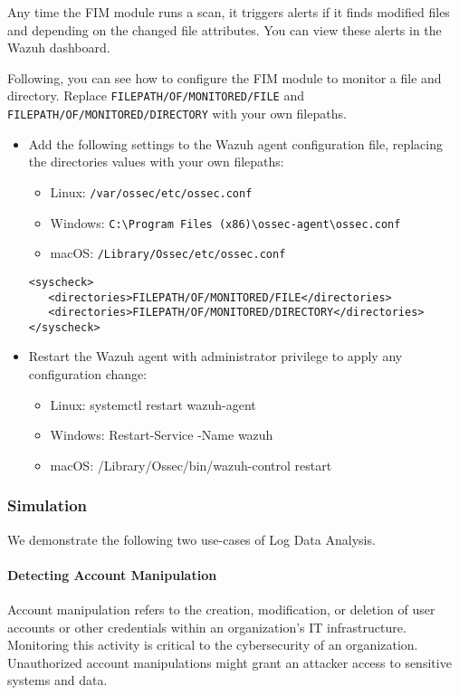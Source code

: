Any time the FIM module runs a scan, it triggers alerts if it finds modified files and depending on the changed file attributes. You can view these alerts in the Wazuh dashboard.

Following, you can see how to configure the FIM module to monitor a file and directory. Replace \texttt{FILEPATH/OF/MONITORED/FILE} and \texttt{FILEPATH/OF/MONITORED/DIRECTORY} with your own filepaths.

\begin{itemize}
    \item Add the following settings to the Wazuh agent configuration file, replacing the directories values with your own filepaths:
          \begin{itemize}
              \item Linux: \texttt{/var/ossec/etc/ossec.conf}
              \item Windows: \texttt{C:\textbackslash Program Files (x86)\textbackslash ossec-agent\textbackslash ossec.conf}
              \item macOS: \texttt{/Library/Ossec/etc/ossec.conf}
          \end{itemize}
          \begin{verbatim}
<syscheck>
   <directories>FILEPATH/OF/MONITORED/FILE</directories>
   <directories>FILEPATH/OF/MONITORED/DIRECTORY</directories>
</syscheck>
        \end{verbatim}


    \item Restart the Wazuh agent with administrator privilege to apply any configuration change:
          \begin{itemize}
              \item Linux: systemctl restart wazuh-agent
              \item Windows: Restart-Service -Name wazuh
              \item macOS: /Library/Ossec/bin/wazuh-control restart
          \end{itemize}
\end{itemize}

\subsubsection{Simulation}
We demonstrate the following two use-cases of Log Data Analysis.
\paragraph{Detecting Account Manipulation}
Account manipulation refers to the creation, modification, or deletion of user accounts or other credentials within an organization's IT infrastructure. Monitoring this activity is critical to the cybersecurity of an organization. Unauthorized account manipulations might grant an attacker access to sensitive systems and data.

